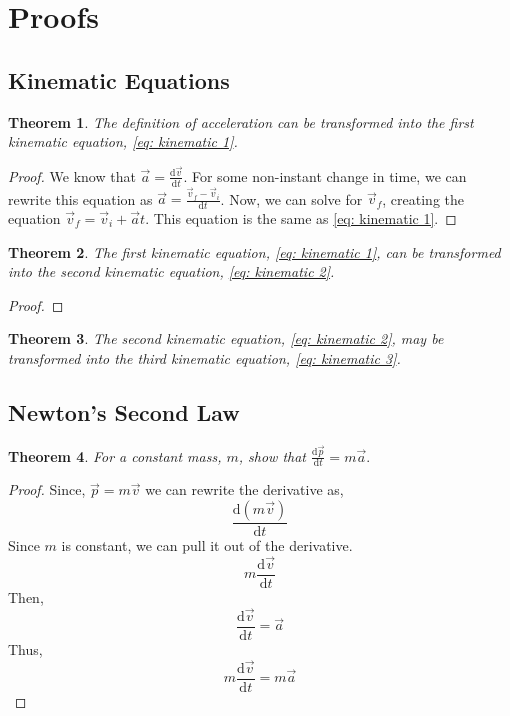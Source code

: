 \documentclass{article}
\newtheorem{theorem}{Theorem}[section]
\begin{document}
\section{Proofs}\label{Appendix C}

\subsection{Kinematic Equations}
\begin{theorem}
    The definition of acceleration can be transformed into the first kinematic equation, \ref{eq: kinematic 1}.
\end{theorem}
\begin{proof}
    We know that $\vec{a} = \frac{\mathrm{d}\vec{v}}{\mathrm{d}t}$. For some non-instant change in time, we can rewrite this equation as 
    $\vec{a} = \frac{\vec{v}_f - \vec{v}_i}{\mathrm{d}t}$. Now, we can solve for $\vec{v}_f$, creating the equation $\vec{v}_f = \vec{v}_i + \vec{a}t$.
    This equation is the same as \ref{eq: kinematic 1}.
\end{proof}

\begin{theorem}
    The first kinematic equation, \ref{eq: kinematic 1}, can be transformed into the second kinematic equation, \ref{eq: kinematic 2}.
\end{theorem}
\begin{proof}
      
\end{proof}

\begin{theorem}
    The second kinematic equation, \ref{eq: kinematic 2}, may be transformed into the third kinematic equation, \ref{eq: kinematic 3}.
\end{theorem}

\subsection{Newton's Second Law}
\begin{theorem}
For a constant mass, $m$, show that $\frac{\mathrm{d}\vec{p}}{\mathrm{d}t} = m\vec{a}.$
\end{theorem}
\begin{proof}
    Since, $\vec{p} = m \vec{v}$ we can rewrite the derivative as,
    \[ \frac{\mathrm{d}(m \vec{v})}{\mathrm{d}t} \]
    Since $m$ is constant, we can pull it out of the derivative.
    \[ m\frac{\mathrm{d}\vec{v}}{\mathrm{d}t} \]
    Then,
    \[\frac{\mathrm{d}\vec{v}}{\mathrm{d}t} = \vec{a}\]
    Thus, \[ m\frac{\mathrm{d}\vec{v}}{\mathrm{d}t} = m\vec{a}\]
\end{proof}
\end{document}
